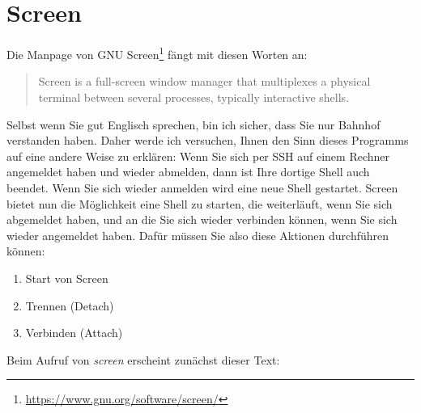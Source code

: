 \documentclass[titlepage,a4paper]{article}
\begin{document}
\section{Screen}
\label{sec:screen}

Die Manpage von GNU Screen\footnote{\url{https://www.gnu.org/software/screen/}} fängt mit diesen Worten an:

\begin{quote}
Screen is a full-screen window manager that multiplexes a physical terminal between several processes, typically interactive shells.
\end{quote}

Selbst wenn Sie gut Englisch sprechen, bin ich sicher, dass Sie nur Bahnhof verstanden haben.
Daher werde ich versuchen, Ihnen den Sinn dieses Programms auf eine andere Weise zu erklären:
Wenn Sie sich per SSH auf einem Rechner angemeldet haben und wieder abmelden,
dann ist Ihre dortige Shell auch beendet.  Wenn Sie sich wieder anmelden wird eine neue
Shell gestartet.  Screen bietet nun die Möglichkeit eine Shell zu starten,
die weiterläuft, wenn Sie sich abgemeldet haben, und an die Sie sich wieder verbinden
können, wenn Sie sich wieder angemeldet haben.
Dafür müssen Sie also diese Aktionen durchführen können:

\begin{enumerate}
\setlength{\itemsep}{0pt}
\item Start von Screen
\item Trennen (Detach)
\item Verbinden (Attach)
\end{enumerate}

\noindent
Beim Aufruf von \emph{screen} erscheint zunächst dieser Text:
\end{document}
